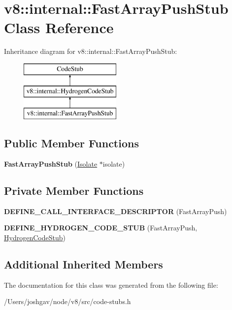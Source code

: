 \hypertarget{classv8_1_1internal_1_1_fast_array_push_stub}{}\section{v8\+:\+:internal\+:\+:Fast\+Array\+Push\+Stub Class Reference}
\label{classv8_1_1internal_1_1_fast_array_push_stub}
Inheritance diagram for v8\+:\+:internal\+:\+:Fast\+Array\+Push\+Stub\+:\begin{figure}[H]
\begin{center}
\leavevmode
\includegraphics[height=3.000000cm]{classv8_1_1internal_1_1_fast_array_push_stub}
\end{center}
\end{figure}
\subsection*{Public Member Functions}
\begin{DoxyCompactItemize}
\item 
{\bfseries Fast\+Array\+Push\+Stub} (\hyperlink{classv8_1_1internal_1_1_isolate}{Isolate} $\ast$isolate)\hypertarget{classv8_1_1internal_1_1_fast_array_push_stub_a5a1087982547daee325bf456b7ffd931}{}\label{classv8_1_1internal_1_1_fast_array_push_stub_a5a1087982547daee325bf456b7ffd931}

\end{DoxyCompactItemize}
\subsection*{Private Member Functions}
\begin{DoxyCompactItemize}
\item 
{\bfseries D\+E\+F\+I\+N\+E\+\_\+\+C\+A\+L\+L\+\_\+\+I\+N\+T\+E\+R\+F\+A\+C\+E\+\_\+\+D\+E\+S\+C\+R\+I\+P\+T\+OR} (Fast\+Array\+Push)\hypertarget{classv8_1_1internal_1_1_fast_array_push_stub_ad6568490654254cbadfe003d3de94bd1}{}\label{classv8_1_1internal_1_1_fast_array_push_stub_ad6568490654254cbadfe003d3de94bd1}

\item 
{\bfseries D\+E\+F\+I\+N\+E\+\_\+\+H\+Y\+D\+R\+O\+G\+E\+N\+\_\+\+C\+O\+D\+E\+\_\+\+S\+T\+UB} (Fast\+Array\+Push, \hyperlink{classv8_1_1internal_1_1_hydrogen_code_stub}{Hydrogen\+Code\+Stub})\hypertarget{classv8_1_1internal_1_1_fast_array_push_stub_ad40a6cff6009c192685aea1bd135d0e2}{}\label{classv8_1_1internal_1_1_fast_array_push_stub_ad40a6cff6009c192685aea1bd135d0e2}

\end{DoxyCompactItemize}
\subsection*{Additional Inherited Members}


The documentation for this class was generated from the following file\+:\begin{DoxyCompactItemize}
\item 
/\+Users/joshgav/node/v8/src/code-\/stubs.\+h\end{DoxyCompactItemize}
